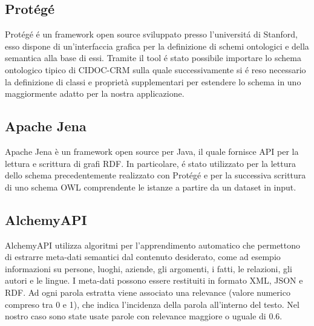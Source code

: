 \documentclass[11pt,a4paper]{article}
\begin{document}
\subsection{Prot\'eg\'e}
Prot\'eg\'e \'e un framework open source sviluppato presso l'universit\'a di Stanford, esso dispone di un'interfaccia grafica per la definizione di schemi ontologici e della semantica alla base di essi. Tramite il tool \'e stato possibile importare lo schema ontologico tipico di CIDOC-CRM sulla quale successivamente si \'e reso necessario la definizione di classi e proprietà supplementari per estendere lo schema in uno maggiormente adatto per la nostra applicazione.

\subsection{Apache Jena}
Apache Jena è un framework open source per Java, il quale fornisce API per la lettura e scrittura di grafi RDF. In particolare, \'e stato utilizzato per la lettura dello schema precedentemente realizzato con Prot\'eg\'e e per la successiva scrittura di uno schema OWL comprendente le istanze a partire da un dataset in input.

\subsection{AlchemyAPI}
AlchemyAPI utilizza algoritmi per  l'apprendimento automatico che permettono di  estrarre meta-dati semantici dal contenuto desiderato, come ad esempio informazioni su persone, luoghi, aziende, gli argomenti, i fatti, le relazioni, gli autori e le lingue. I meta-dati possono essere restituiti in formato XML, JSON e RDF. \newline
Ad ogni parola estratta viene associato una relevance (valore numerico compreso tra 0 e 1), che indica l'incidenza della parola all'interno del testo.
Nel nostro caso sono state usate parole con relevance maggiore o uguale di 0.6. 
\end{document}
